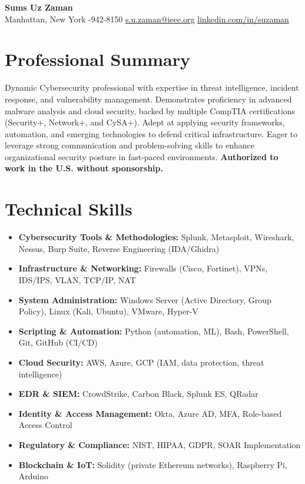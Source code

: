 \documentclass[11pt]{article}
\begin{document}
\begin{center}
    {\Huge \textbf{Sums Uz Zaman}}\\[3pt]
    Manhattan, New York \;-942-8150 \;\; \href{mailto:s.u.zaman@ieee.org}{s.u.zaman@ieee.org} \;\; \href{https://linkedin.com/in/suzaman}{linkedin.com/in/suzaman}
\end{center}

\vspace{1em}
\section*{Professional Summary}
Dynamic Cybersecurity professional with expertise in threat intelligence, incident response, and vulnerability management. Demonstrates proficiency in advanced malware analysis and cloud security, backed by multiple CompTIA certifications (Security+, Network+, and CySA+). Adept at applying security frameworks, automation, and emerging technologies to defend critical infrastructure. Eager to leverage strong communication and problem-solving skills to enhance organizational security posture in fast-paced environments.
\textbf{Authorized to work in the U.S. without sponsorship.}

\section*{Technical Skills}
\begin{itemize}
    \item \textbf{Cybersecurity Tools \& Methodologies:} Splunk, Metasploit, Wireshark, Nessus, Burp Suite, Reverse Engineering (IDA/Ghidra)
    \item \textbf{Infrastructure \& Networking:} Firewalls (Cisco, Fortinet), VPNs, IDS/IPS, VLAN, TCP/IP, NAT
    \item \textbf{System Administration:} Windows Server (Active Directory, Group Policy), Linux (Kali, Ubuntu), VMware, Hyper-V
    \item \textbf{Scripting \& Automation:} Python (automation, ML), Bash, PowerShell, Git, GitHub (CI/CD)
    \item \textbf{Cloud Security:} AWS, Azure, GCP (IAM, data protection, threat intelligence)
    \item \textbf{EDR \& SIEM:} CrowdStrike, Carbon Black, Splunk ES, QRadar
    \item \textbf{Identity \& Access Management:} Okta, Azure AD, MFA, Role-based Access Control
    \item \textbf{Regulatory \& Compliance:} NIST, HIPAA, GDPR, SOAR Implementation
    \item \textbf{Blockchain \& IoT:} Solidity (private Ethereum networks), Raspberry Pi, Arduino
\end{itemize}
\end{document}
